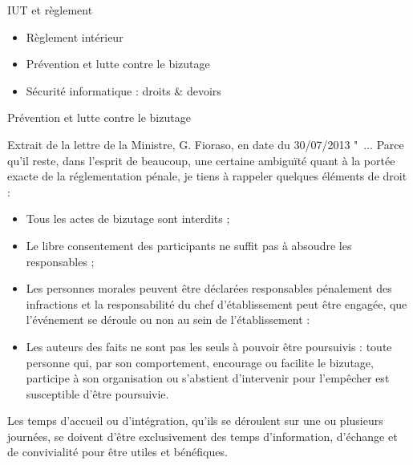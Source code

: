 \documentclass [xcolor=x11names,t] {beamer}
\begin{document}
\begin{frame}{IUT et règlement}
	\scriptsize
	\begin{itemize}
	\item Règlement intérieur
	\item Prévention et lutte contre le bizutage
	\item	Sécurité informatique : droits \& devoirs
	\end{itemize}	
	
	\begin{block}{Prévention et lutte contre le bizutage}

		Extrait de la lettre de la Ministre, G. Fioraso, en date du 30/07/2013
" ... Parce qu’il reste, dans l’esprit de beaucoup, une certaine ambiguïté quant à la portée exacte de la réglementation pénale, je tiens à rappeler quelques éléments de droit :
\begin{itemize}
	\item Tous les actes de bizutage sont interdits ;
	\item Le libre consentement des participants ne suffit pas à absoudre les responsables ;
	\item Les personnes morales peuvent être déclarées responsables pénalement des infractions et la responsabilité du chef d’établissement peut être engagée, que l’événement se déroule ou non au sein de l’établissement :
	\item 	Les auteurs des faits ne sont pas les seuls à pouvoir être poursuivis : toute personne qui, par son comportement, encourage ou facilite le bizutage, participe à son organisation ou s’abstient d’intervenir pour l’empêcher est susceptible d’être poursuivie.
	
\end{itemize}


Les temps d’accueil ou d’intégration, qu’ils se déroulent sur une ou plusieurs journées, se doivent d’être exclusivement des temps d’information, d’échange et de convivialité pour être utiles et bénéfiques.		
	\end{block}
	
\end{frame}
\scriptsize
\end{document}
